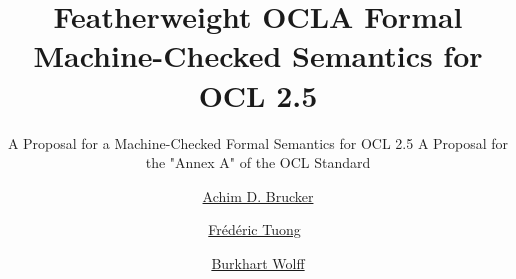 \documentclass[10pt,DIV12,a4paper,openright,twoside,abstracton]{scrreprt}
\begin{document}
\renewcommand{\subsubsectionautorefname}{Section}
\renewcommand{\subsectionautorefname}{Section}
\renewcommand{\sectionautorefname}{Section}
\renewcommand{\chapterautorefname}{Chapter}
\newcommand{\subtableautorefname}{\tableautorefname}
\newcommand{\subfigureautorefname}{\figureautorefname}

\newenvironment{matharray}[1]{\[\begin{array}{#1}}{\end{array}\]} %
\newcommand{\indexdef}[3]%
{\ifthenelse{\equal{}{#1}}{\index{#3 (#2)|bold}}{\index{#3 (#1\ #2)|bold}}} %



\isatagafp
  \title{Featherweight OCL}
  \subtitle{A Proposal for a Machine-Checked Formal Semantics for OCL 2.5 %
  }
\endisatagafp
\isatagannexa
  \title{A Formal Machine-Checked Semantics for OCL 2.5}
  \subtitle{A Proposal for the "Annex A" of the OCL Standard}
\endisatagannexa
\author{%
  \href{http://www.brucker.ch/}{Achim D. Brucker}\footnotemark[1]
  \and
  \href{https://www.lri.fr/~tuong/}{Fr\'ed\'eric Tuong}\footnotemark[2]~\footnotemark[3]
  \and
  \href{https://www.lri.fr/~wolff/}{Burkhart Wolff}\footnotemark[2]}
\publishers{%
  \footnotemark[1]~SAP SE\\
  Vincenz-Priessnitz-Str. 1, 76131 Karlsruhe,
  Germany \texorpdfstring{\\}{} \href{mailto:"Achim D. Brucker"
    <achim.brucker@sap.com>}{achim.brucker@sap.com}\\[2em]
  \footnotemark[2]~Universit\'e Paris-Saclay, Univ Paris Sud, LRI, CNRS\\
  b\^at. 650, 91405 Orsay,
  France \texorpdfstring{\\}{} \href{mailto:"Burkhart Wolff"
    <burkhart.wolff@lri.fr>}{burkhart.wolff@lri.fr}\\[2em]
  \footnotemark[3]~IRT SystemX\\
  8 av.~de la Vauve, 91120 Palaiseau,
  France\\
    frederic.tuong@\{u-psud, irt-systemx, lri\}.fr
}


\maketitle
\isatagannexa
\cleardoublepage
\endisatagannexa
\end{document}
